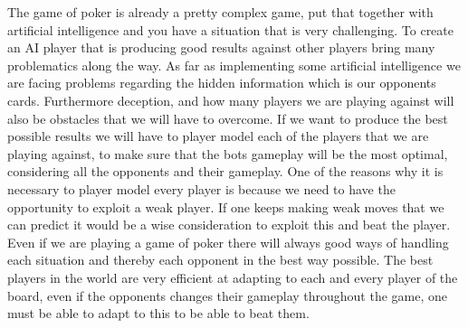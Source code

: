 The game of poker is already a pretty complex game, put that together with artificial intelligence and you have a situation that is very challenging. To create an AI player that is producing good results against other players bring many problematics along the way. As far as implementing some artificial intelligence we are facing problems regarding the hidden information which is our opponents cards. Furthermore deception, and how many players we are playing against will also be obstacles that we will have to overcome.
 If we want to produce the best possible results we will have to player model each of the players that we are playing against, to make sure that the bots gameplay will be the most optimal, considering all the opponents and their gameplay.
One of the reasons why it is necessary to player model every player is because we need to have the opportunity to exploit a weak player. If one keeps making weak moves that we can predict it would be a wise consideration to exploit this and beat the player. 
Even if we are playing a game of poker there will always good ways of handling each situation and thereby each opponent in the best way possible. The best players in the world are very efficient at adapting to each and every player of the board, even if the opponents changes their gameplay throughout the game, one must be able to adapt to this to be able to beat them.

